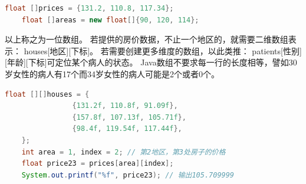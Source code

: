 \begin{lstlisting}[language=java]
	float []prices = {131.2, 110.8, 117.34};
	float []areas = new float[]{90, 120, 114};
\end{lstlisting}

\bigskip

以上称之为一位数组。
若提供的房价数据，不止一个地区的，就需要二维数组表示：
houses[地区][下标]。
若需要创建更多维度的数组，以此类推：
patients[性别][年龄][下标]可定位某个病人的状态。
Java数组不要求每一行的长度相等，譬如30岁女性的病人有17个而34岁女性的病人可能是2个或者0个。

\begin{lstlisting}[language=java]
	float [][]houses = {
				{131.2f, 110.8f, 91.09f},
				{157.8f, 107.13f, 105.71f},
				{98.4f, 119.54f, 117.44f},
	};
	int area = 1, index = 2; // 第2地区，第3处房子的价格
	float price23 = prices[area][index];
	System.out.printf("%f", price23); // 输出105.709999
\end{lstlisting}

\bigskip

